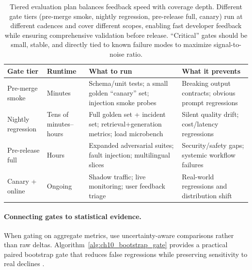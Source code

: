 \begin{table}[t]
\centering
\caption{Tiered evaluation plan balances feedback speed with coverage depth. Different gate tiers (pre-merge smoke, nightly regression, pre-release full, canary) run at different cadences and cover different scopes, enabling fast developer feedback while ensuring comprehensive validation before release. ``Critical'' gates should be small, stable, and directly tied to known failure modes to maximize signal-to-noise ratio.}
\label{tab:ch10_tiered_plan}
\small
\setlength{\tabcolsep}{6pt}
\renewcommand{\arraystretch}{1.3}
\begin{tabularx}{\linewidth}{@{}p{2.7cm}p{2.1cm}X X@{}}
\toprule
\rowcolor{gray!15}
\textbf{Gate tier} & \textbf{Runtime} & \textbf{What to run} & \textbf{What it prevents} \\
\midrule
Pre-merge smoke &
Minutes &
Schema/unit tests; a small golden ``canary'' set; injection smoke probes &
Breaking output contracts; obvious prompt regressions \\
\midrule
Nightly regression &
Tens of minutes--hours &
Full golden set + incident set; retrieval+generation metrics; load microbench &
Silent quality drift; cost/latency regressions \\
\midrule
Pre-release full &
Hours &
Expanded adversarial suites; fault injection; multilingual slices &
Security/safety gaps; systemic workflow failures \\
\midrule
Canary + online &
Ongoing &
Shadow traffic; live monitoring; user feedback triage &
Real-world regressions and distribution shift \\
\bottomrule
\end{tabularx}
\end{table}

\paragraph{Connecting gates to statistical evidence.}
When gating on aggregate metrics, use uncertainty-aware comparisons rather than raw deltas.
Algorithm~\ref{alg:ch10_bootstrap_gate} provides a practical paired bootstrap gate that reduces false regressions while preserving sensitivity to real declines \cite{efron1994bootstrap}.


